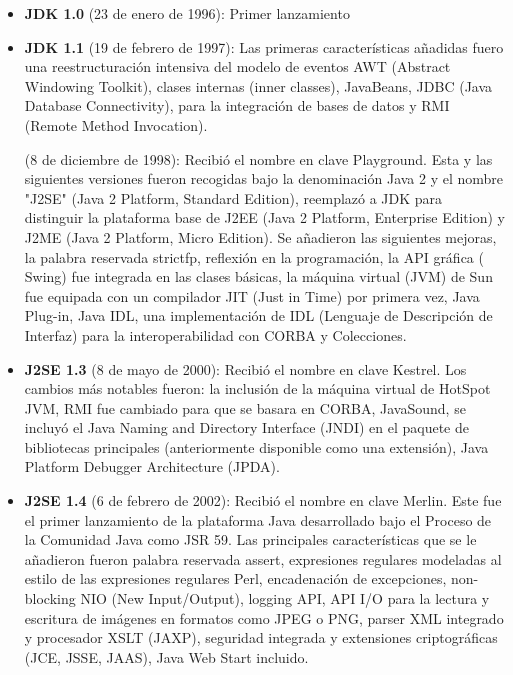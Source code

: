 \begin{itemize}

	\item \textbf{JDK 1.0} (23 de enero de 1996): Primer lanzamiento
	
	\item \textbf{JDK 1.1} (19 de febrero de 1997): Las primeras características añadidas fuero una reestructuración intensiva del modelo de eventos AWT (Abstract Windowing Toolkit), clases internas (inner classes), JavaBeans, JDBC (Java Database Connectivity), para la integración de bases de datos y RMI (Remote Method Invocation).
	
     (8 de diciembre de 1998): Recibió el nombre en clave Playground. Esta y las siguientes versiones fueron recogidas bajo la denominación Java 2 y el nombre "J2SE" (Java 2 Platform, Standard Edition), reemplazó a JDK para distinguir la plataforma base de J2EE (Java 2 Platform, Enterprise Edition) y J2ME (Java 2 Platform, Micro Edition). 
    Se añadieron las siguientes mejoras, la palabra reservada strictfp, reflexión en la programación, la API gráfica ( Swing) fue integrada en las clases básicas, la máquina virtual (JVM) de Sun fue equipada con un compilador JIT (Just in Time) por primera vez, Java Plug-in, Java IDL, una implementación de IDL (Lenguaje de Descripción de Interfaz) para la interoperabilidad con CORBA y Colecciones.

    \item \textbf{J2SE 1.3} (8 de mayo de 2000): Recibió el nombre en clave Kestrel. Los cambios más notables fueron: la inclusión de la máquina virtual de HotSpot JVM, RMI fue cambiado para que se basara en CORBA, JavaSound, se incluyó el Java Naming and Directory Interface (JNDI) en el paquete de bibliotecas principales (anteriormente disponible como una extensión), Java Platform Debugger Architecture (JPDA).

    \item \textbf{J2SE 1.4} (6 de febrero de 2002): Recibió el nombre en clave Merlin. Este fue el primer lanzamiento de la plataforma Java desarrollado bajo el Proceso de la Comunidad Java como JSR 59. Las principales características que se le añadieron fueron palabra reservada assert, expresiones regulares modeladas al estilo de las expresiones regulares Perl, encadenación de excepciones, non-blocking NIO (New Input/Output), logging API, API I/O para la lectura y escritura de imágenes en formatos como JPEG o PNG, parser XML integrado y procesador XSLT (JAXP), seguridad integrada y extensiones criptográficas (JCE, JSSE, JAAS), Java Web Start incluido.
    

\end{itemize}
